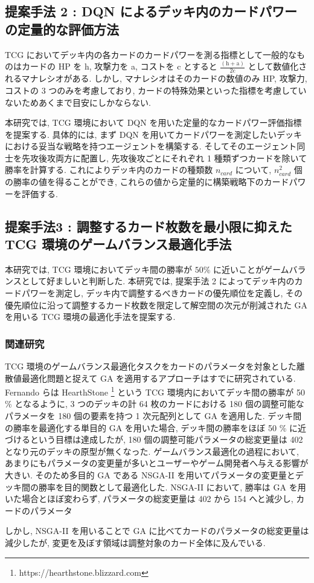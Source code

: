 \documentclass[12pt]{jarticle}
\begin{document}
\subsection{提案手法 2 : DQN によるデッキ内のカードパワーの定量的な評価方法}
TCG においてデッキ内の各カードのカードパワーを測る指標として一般的なものはカードの HP を h, 攻撃力を a, コストを c とすると $\frac{(\mathrm{h} + \mathrm{a})}{2\mathrm{c}} $ として数値化されるマナレシオがある. 
しかし, マナレシオはそのカードの数値のみ HP, 攻撃力, コストの 3 つのみを考慮しており, カードの特殊効果といった指標を考慮していないためあくまで目安にしかならない. \par
本研究では, TCG 環境において DQN を用いた定量的なカードパワー評価指標を提案する.
具体的には, まず DQN を用いてカードパワーを測定したいデッキにおける妥当な戦略を持つエージェントを構築する. 
そしてそのエージェント同士を先攻後攻両方に配置し, 先攻後攻ごとにそれぞれ 1 種類ずつカードを除いて勝率を計算する. これによりデッキ内のカードの種類数 $n_{card}$ について, $n_{card}^2$ 個の勝率の値を得ることができ, これらの値から定量的に構築戦略下のカードパワーを評価する. 


\subsection{提案手法3 : 調整するカード枚数を最小限に抑えた TCG 環境のゲームバランス最適化手法}
本研究では, TCG 環境においてデッキ間の勝率が $50\%$ に近いことがゲームバランスとして好ましいと判断した. 本研究では, 提案手法 2 によってデッキ内のカードパワーを測定し, デッキ内で調整するべきカードの優先順位を定義し, その優先順位に沿って調整するカード枚数を限定して解空間の次元が削減された GA を用いる TCG 環境の最適化手法を提案する. 

\subsubsection{関連研究}
\label{hearthstone}
TCG 環境のゲームバランス最適化タスクをカードのパラメータを対象とした離散値最適化問題と捉えて GA を適用するアプローチはすでに研究されている.
Fernando らは HearthStone \footnote[2]{https://hearthstone.blizzard.com} という TCG 環境内においてデッキ間の勝率が 50 \% となるように, 3 つのデッキの計 64 枚のカードにおける 180 個の調整可能なパラメータを 180 個の要素を持つ 1 次元配列として GA を適用した\cite{EvolvingHearthStone}.
デッキ間の勝率を最適化する単目的 GA を用いた場合, デッキ間の勝率をほぼ 50 \% に近づけるという目標は達成したが, 180 個の調整可能パラメータの総変更量は 402 となり元のデッキの原型が無くなった. 
ゲームバランス最適化の過程において, あまりにもパラメータの変更量が多いとユーザーやゲーム開発者へ与える影響が大きい. そのため多目的 GA である NSGA-II を用いてパラメータの変更量とデッキ間の勝率を目的関数として最適化した.
NSGA-II において, 勝率は GA を用いた場合とほぼ変わらず, パラメータの総変更量は 402 から 154 へと減少し, カードのパラメータ
\par
しかし, NSGA-II を用いることで GA に比べてカードのパラメータの総変更量は減少したが, 変更を及ぼす領域は調整対象のカード全体に及んでいる.  
\end{document}
